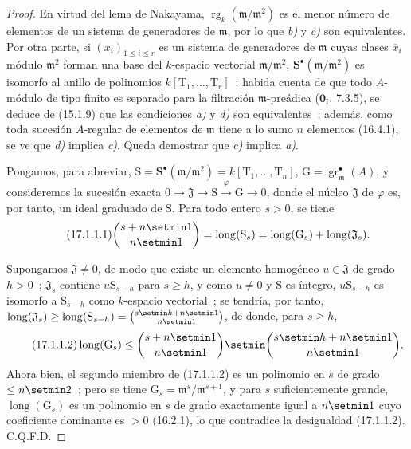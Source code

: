 \begin{proof}
En virtud del lema de Nakayama,
$\operatorname{rg}_k(\mathfrak{m}/\mathfrak{m}^2)$ es el menor número de
elementos de un sistema de generadores de $\mathfrak{m}$, por lo que \emph{b)} y \emph{c)} son
equivalentes. Por otra parte, si $(x_i)_{1\leq i\leq r}$ es un sistema de
generadores de $\mathfrak{m}$ cuyas clases $\overline{x}_i$ módulo
$\mathfrak{m}^2$ forman una base del $k$-espacio vectorial
$\mathfrak{m}/\mathfrak{m}^2$, $\mathbf S^\bullet(\mathfrak{m}/\mathfrak{m}^2)$
es isomorfo al anillo de
polinomios $k[\mathrm{T}_1,\ldots,\mathrm{T}_r]$~; habida cuenta de que todo
$A$-módulo de tipo finito es separado para la filtración $\mathfrak{m}$-preádica
($\mathbf{0}_{\mathrm I}$, 7.3.5), se deduce de (15.1.9) que las condiciones \emph{a)} y \emph{d)}
son equivalentes~; además, como toda sucesión $A$-regular de elementos de
$\mathfrak{m}$ tiene a lo sumo $n$ elementos (16.4.1), se ve que \emph{d)} implica \emph{c)}.
Queda demostrar que \emph{c)} implica \emph{a)}.

Pongamos, para abreviar,
$\mathrm{S}=\mathbf S^\bullet(\mathfrak{m}/\mathfrak{m}^2)
=k[\mathrm{T}_1,\ldots,\mathrm{T}_n]$,
$\mathrm{G}=\operatorname{gr}^\bullet_{\mathfrak{m}}(A)$, y consideremos la sucesión
exacta
$0\longrightarrow\mathfrak{J}\longrightarrow\mathrm{S}
\xrightarrow{\varphi}\mathrm{G}\longrightarrow0$, donde el núcleo
$\mathfrak{J}$ de $\varphi$ es, por tanto, un ideal graduado de $\mathrm{S}$. Para
todo entero $s>0$, se tiene
\begin{equation}
\label{0.17.1.1.1-es}
\tag{17.1.1.1}
  \binom{s+n\setmin 1}{n\setmin 1}
  =\operatorname{long}(\mathrm{S}_s)
  =\operatorname{long}(\mathrm{G}_s)
  +\operatorname{long}(\mathfrak{J}_s).
\end{equation}

Supongamos $\mathfrak{J}\neq0$, de modo que existe un elemento homogéneo
$u\in\mathfrak{J}$ de grado $h>0$~; $\mathfrak{J}_s$ contiene
$u\mathrm{S}_{s-h}$ para $s\geq h$, y como $u\neq0$ y $\mathrm{S}$ es
íntegro, $u\mathrm{S}_{s-h}$ es isomorfo a $\mathrm{S}_{s-h}$ como
$k$-espacio vectorial~; se tendría, por tanto,
$\operatorname{long}(\mathfrak{J}_s)\geq
\operatorname{long}(\mathrm{S}_{s-h})=\binom{s\setmin h+n\setmin 1}{n\setmin 1}$, de donde, para
$s\geq h$,
\begin{equation}
\label{0.17.1.1.2-es}
\tag{17.1.1.2}
  \operatorname{long}(\mathrm{G}_s)
  \leq\binom{s+n\setmin 1}{n\setmin 1}\setmin\binom{s\setmin h+n\setmin 1}{n\setmin 1}.
\end{equation}
Ahora bien, el segundo miembro de (17.1.1.2) es un polinomio en $s$ de grado
$\leq n\setmin 2$~; pero se tiene
$\mathrm{G}_s=\mathfrak{m}^s/\mathfrak{m}^{s+1}$, y para $s$ suficientemente grande,
$\operatorname{long}(\mathrm{G}_s)$ es un polinomio en $s$ de grado exactamente
igual a $n\setmin 1$ cuyo coeficiente dominante es $>0$ (16.2.1), lo que contradice
la desigualdad (17.1.1.2). C.Q.F.D.
\end{proof}

